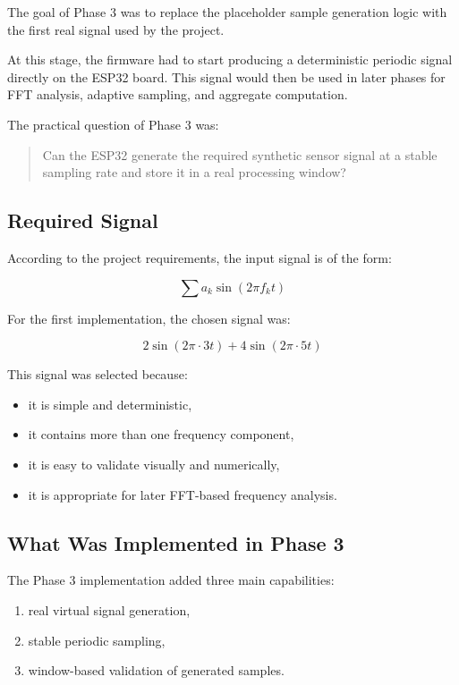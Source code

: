 \documentclass[12pt,a4paper]{article}
\begin{document}
The goal of Phase 3 was to replace the placeholder sample generation logic with
the first real signal used by the project.

At this stage, the firmware had to start producing a deterministic periodic
signal directly on the ESP32 board. This signal would then be used in later
phases for FFT analysis, adaptive sampling, and aggregate computation.

The practical question of Phase 3 was:

\begin{quote}
Can the ESP32 generate the required synthetic sensor signal at a stable
sampling rate and store it in a real processing window?
\end{quote}

\subsection{Required Signal}

According to the project requirements, the input signal is of the form:

\[
\sum a_k \sin(2\pi f_k t)
\]

For the first implementation, the chosen signal was:

\[
2\sin(2\pi \cdot 3t) + 4\sin(2\pi \cdot 5t)
\]

This signal was selected because:

\begin{itemize}
    \item it is simple and deterministic,
    \item it contains more than one frequency component,
    \item it is easy to validate visually and numerically,
    \item it is appropriate for later FFT-based frequency analysis.
\end{itemize}

\subsection{What Was Implemented in Phase 3}

The Phase 3 implementation added three main capabilities:

\begin{enumerate}[label=\arabic*.]
    \item real virtual signal generation,
    \item stable periodic sampling,
    \item window-based validation of generated samples.
\end{enumerate}
\end{document}
